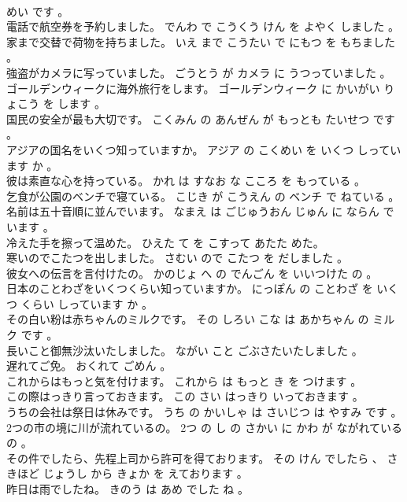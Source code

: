 \documentclass[8pt]{extreport}
\begin{document}
\begin{CJK}{UTF8}{min}
\\	めい です 。 
\\	電話で航空券を予約しました。	でんわ で こうくう けん を よやく しました 。 
\\	家まで交替で荷物を持ちました。	いえ まで こうたい で にもつ を もちました 。 
\\	強盗がカメラに写っていました。	ごうとう が カメラ に うつっていました 。 
\\	ゴールデンウィークに海外旅行をします。	ゴールデンウィーク に かいがい りょこう を します 。 
\\	国民の安全が最も大切です。	こくみん の あんぜん が もっとも たいせつ です 。 
\\	アジアの国名をいくつ知っていますか。	アジア の こくめい を いくつ しっています か 。 
\\	彼は素直な心を持っている。	かれ は すなお な こころ を もっている 。 
\\	乞食が公園のベンチで寝ている。	こじき が こうえん の ベンチ で ねている 。 
\\	名前は五十音順に並んでいます。	なまえ は ごじゅうおん じゅん に ならん でいます 。 
\\	冷えた手を擦って温めた。	ひえた て を こすって あたた めた。 
\\	寒いのでこたつを出しました。	さむい ので こたつ を だしました 。 
\\	彼女への伝言を言付けたの。	かのじょ へ の でんごん を いいつけた の 。 
\\	日本のことわざをいくつくらい知っていますか。	にっぽん の ことわざ を いくつ くらい しっています か 。 
\\	その白い粉は赤ちゃんのミルクです。	その しろい こな は あかちゃん の ミルク です 。 
\\	長いこと御無沙汰いたしました。	ながい こと ごぶさたいたしました 。 
\\	遅れてご免。	おくれて ごめん 。 
\\	これからはもっと気を付けます。	これから は もっと き を つけます 。 
\\	この際はっきり言っておきます。	この さい はっきり いっておきます 。 
\\	うちの会社は祭日は休みです。	うち の かいしゃ は さいじつ は やすみ です 。 
\\	2つの市の境に川が流れているの。	2つ の し の さかい に かわ が ながれている の 。 
\\	その件でしたら、先程上司から許可を得ております。	その けん でしたら 、 さきほど じょうし から きょか を えております 。 
\\	昨日は雨でしたね。	きのう は あめ でした ね 。 

\end{CJK}
\end{document}
